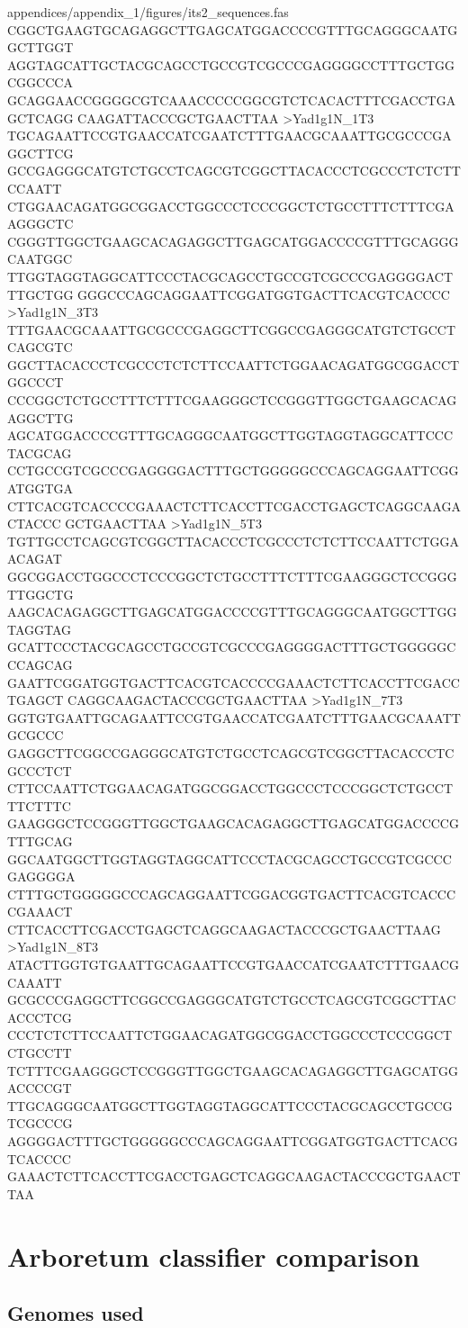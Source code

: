 \begin{filecontents*}{appendices/appendix_1/figures/its2_sequences.fas}
CGGCTGAAGTGCAGAGGCTTGAGCATGGACCCCGTTTGCAGGGCAATGGCTTGGT
AGGTAGCATTGCTACGCAGCCTGCCGTCGCCCGAGGGGCCTTTGCTGGCGGCCCA
GCAGGAACCGGGGCGTCAAACCCCCGGCGTCTCACACTTTCGACCTGAGCTCAGG
CAAGATTACCCGCTGAACTTAA
>Yad1g1N_1T3
TGCAGAATTCCGTGAACCATCGAATCTTTGAACGCAAATTGCGCCCGAGGCTTCG
GCCGAGGGCATGTCTGCCTCAGCGTCGGCTTACACCCTCGCCCTCTCTTCCAATT
CTGGAACAGATGGCGGACCTGGCCCTCCCGGCTCTGCCTTTCTTTCGAAGGGCTC
CGGGTTGGCTGAAGCACAGAGGCTTGAGCATGGACCCCGTTTGCAGGGCAATGGC
TTGGTAGGTAGGCATTCCCTACGCAGCCTGCCGTCGCCCGAGGGGACTTTGCTGG
GGGCCCAGCAGGAATTCGGATGGTGACTTCACGTCACCCC
>Yad1g1N_3T3
TTTGAACGCAAATTGCGCCCGAGGCTTCGGCCGAGGGCATGTCTGCCTCAGCGTC
GGCTTACACCCTCGCCCTCTCTTCCAATTCTGGAACAGATGGCGGACCTGGCCCT
CCCGGCTCTGCCTTTCTTTCGAAGGGCTCCGGGTTGGCTGAAGCACAGAGGCTTG
AGCATGGACCCCGTTTGCAGGGCAATGGCTTGGTAGGTAGGCATTCCCTACGCAG
CCTGCCGTCGCCCGAGGGGACTTTGCTGGGGGCCCAGCAGGAATTCGGATGGTGA
CTTCACGTCACCCCGAAACTCTTCACCTTCGACCTGAGCTCAGGCAAGACTACCC
GCTGAACTTAA
>Yad1g1N_5T3
TGTTGCCTCAGCGTCGGCTTACACCCTCGCCCTCTCTTCCAATTCTGGAACAGAT
GGCGGACCTGGCCCTCCCGGCTCTGCCTTTCTTTCGAAGGGCTCCGGGTTGGCTG
AAGCACAGAGGCTTGAGCATGGACCCCGTTTGCAGGGCAATGGCTTGGTAGGTAG
GCATTCCCTACGCAGCCTGCCGTCGCCCGAGGGGACTTTGCTGGGGGCCCAGCAG
GAATTCGGATGGTGACTTCACGTCACCCCGAAACTCTTCACCTTCGACCTGAGCT
CAGGCAAGACTACCCGCTGAACTTAA
>Yad1g1N_7T3
GGTGTGAATTGCAGAATTCCGTGAACCATCGAATCTTTGAACGCAAATTGCGCCC
GAGGCTTCGGCCGAGGGCATGTCTGCCTCAGCGTCGGCTTACACCCTCGCCCTCT
CTTCCAATTCTGGAACAGATGGCGGACCTGGCCCTCCCGGCTCTGCCTTTCTTTC
GAAGGGCTCCGGGTTGGCTGAAGCACAGAGGCTTGAGCATGGACCCCGTTTGCAG
GGCAATGGCTTGGTAGGTAGGCATTCCCTACGCAGCCTGCCGTCGCCCGAGGGGA
CTTTGCTGGGGGCCCAGCAGGAATTCGGACGGTGACTTCACGTCACCCCGAAACT
CTTCACCTTCGACCTGAGCTCAGGCAAGACTACCCGCTGAACTTAAG
>Yad1g1N_8T3
ATACTTGGTGTGAATTGCAGAATTCCGTGAACCATCGAATCTTTGAACGCAAATT
GCGCCCGAGGCTTCGGCCGAGGGCATGTCTGCCTCAGCGTCGGCTTACACCCTCG
CCCTCTCTTCCAATTCTGGAACAGATGGCGGACCTGGCCCTCCCGGCTCTGCCTT
TCTTTCGAAGGGCTCCGGGTTGGCTGAAGCACAGAGGCTTGAGCATGGACCCCGT
TTGCAGGGCAATGGCTTGGTAGGTAGGCATTCCCTACGCAGCCTGCCGTCGCCCG
AGGGGACTTTGCTGGGGGCCCAGCAGGAATTCGGATGGTGACTTCACGTCACCCC
GAAACTCTTCACCTTCGACCTGAGCTCAGGCAAGACTACCCGCTGAACTTAA
\end{filecontents*}


\section{Arboretum classifier comparison}

\subsection{Genomes used}\label{sec:appen_genomes}

